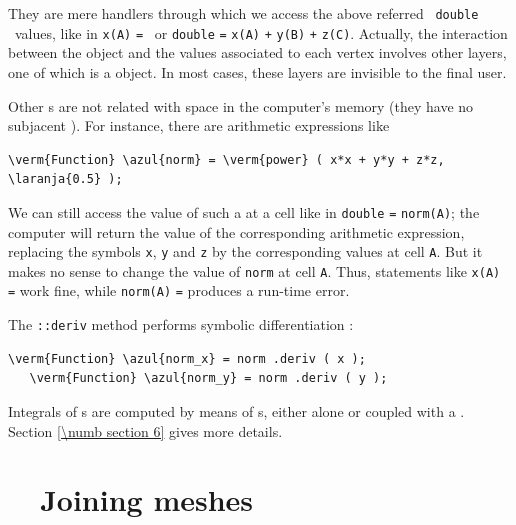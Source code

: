 \noindent They are mere handlers through which we access the above referred \ {\small\tt double}
\ values, like in {\small\tt x(A)} {\small\tt =} {\small\tt {}}\ or
{\small\tt double} {\small\tt {}} {\small\tt =} {\small\tt x(A)} {\small\tt +}
{\small\tt y(B)} {\small\tt +} {\small\tt z(C)}.
Actually, the interaction between the {\small\tt{}} object and the values
associated to each vertex involves other layers, one of which is a {\small\tt{}}
object.
In most cases, these layers are invisible to the final user.

Other {\small\tt{}}s are not related with space in the computer's memory
(they have no subjacent {\small\tt{}}).
For instance, there are arithmetic expressions like 

\begin{Verbatim}[commandchars=\\\{\},formatcom=\small\tt,baselinestretch=0.94]
   \verm{Function} \azul{norm} = \verm{power} ( x*x + y*y + z*z, \laranja{0.5} );
\end{Verbatim}

We can still access the value of such a {\small\tt{}} at a cell like in
{\small\tt double} {\small\tt {}} {\small\tt =} {\small\tt norm(A)};
the computer will return the value of the corresponding arithmetic expression,
replacing the symbols {\small\tt x}, {\small\tt y} and {\small\tt z} by the corresponding
values at cell {\small\tt A}.
But it makes no sense to change the value of {\small\tt norm} at cell {\small\tt A}.
Thus, statements like {\small\tt x(A)} {\small\tt =} {\small\tt{}} work fine,
while {\small\tt norm(A)} {\small\tt =} {\small\tt{}} produces a run-time error.

The {\small\tt{}::deriv} method performs symbolic differentiation :

\begin{Verbatim}[commandchars=\\\{\},formatcom=\small\tt,baselinestretch=0.94]
   \verm{Function} \azul{norm_x} = norm .deriv ( x );
   \verm{Function} \azul{norm_y} = norm .deriv ( y );
\end{Verbatim}

Integrals of {\small\tt{}}s are computed by means of {\small\tt{}}s,
either alone or coupled with a {\small\tt{}}.
Section \ref{\numb section 6} gives more details.


\section{~~Joining meshes}\label{\numb section 1.\numb parag 4}

